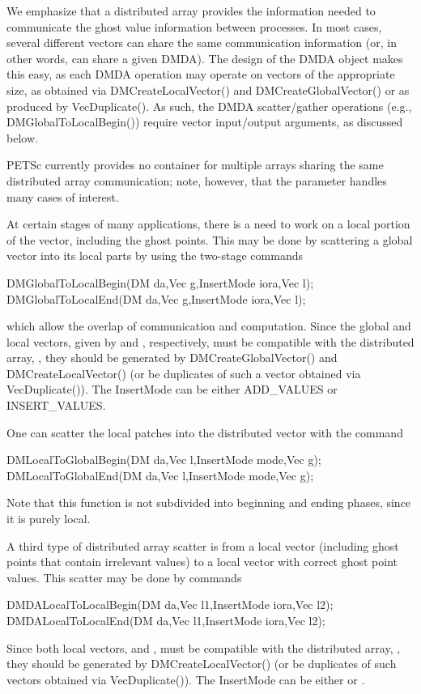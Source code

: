 We emphasize that a distributed array provides the information needed
to communicate the ghost value information between processes.  In most
cases, several different vectors can share the same communication
information (or, in other words, can share a given DMDA).  The
design of the DMDA object makes this easy, as each DMDA
operation may operate on vectors of the appropriate size, as obtained
via DMCreateLocalVector() and DMCreateGlobalVector() or as
produced by VecDuplicate().  As such, the DMDA
scatter/gather operations (e.g., DMGlobalToLocalBegin()) require
vector input/output arguments, as discussed below.

PETSc currently provides no container for multiple arrays sharing the
same distributed array communication; note, however, that the 
parameter handles many cases of interest.

At certain stages of many applications, there is a need to work 
on a local portion of the vector, including the ghost points. 
This may be done by scattering a global vector into its 
local parts by using the two-stage commands
\begin{tabbing}
  DMGlobalToLocalBegin(DM da,Vec g,InsertMode iora,Vec l);\\
  DMGlobalToLocalEnd(DM da,Vec g,InsertMode iora,Vec l);
\end{tabbing}
which allow the overlap of communication and computation.
Since the global and local vectors, given by  and , respectively,
must be compatible with the distributed array, , they should be
generated by DMCreateGlobalVector() 
and DMCreateLocalVector()
(or be duplicates of such a vector obtained via VecDuplicate()).
The InsertMode can be either ADD_VALUES or INSERT_VALUES.

One can scatter the local patches into the distributed vector
with the command
\begin{tabbing}
  DMLocalToGlobalBegin(DM da,Vec l,InsertMode mode,Vec g);
  DMLocalToGlobalEnd(DM da,Vec l,InsertMode mode,Vec g);
\end{tabbing}
Note that this function is not
subdivided into beginning and ending phases, since it is purely local.

A third type of distributed array scatter is from a local
vector (including ghost points that contain irrelevant values) to 
a local vector with correct ghost point values. 
This scatter may be done by
commands
\begin{tabbing}
  DMDALocalToLocalBegin(DM da,Vec l1,InsertMode iora,Vec l2);\\
  DMDALocalToLocalEnd(DM da,Vec l1,InsertMode iora,Vec l2);
\end{tabbing}
Since both local vectors,  and ,
must be compatible with the distributed array, , they should be
generated by DMCreateLocalVector()
(or be duplicates of such vectors obtained via VecDuplicate()).
The InsertMode can be either  or .

